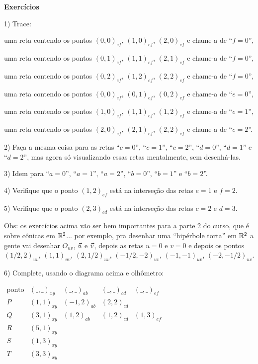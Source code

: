 \documentclass[oneside]{book}
\begin{document}
{\setlength{\parindent}{0em}

{\bf Exercícios}

1) Trace:

uma reta contendo os pontos $(0,0)_{ef}$, $(1,0)_{ef}$, $(2,0)_{ef}$ e
chame-a de ``$f=0$'',

uma reta contendo os pontos $(0,1)_{ef}$, $(1,1)_{ef}$, $(2,1)_{ef}$ e
chame-a de ``$f=0$'',

uma reta contendo os pontos $(0,2)_{ef}$, $(1,2)_{ef}$, $(2,2)_{ef}$ e
chame-a de ``$f=0$'',

uma reta contendo os pontos $(0,0)_{ef}$, $(0,1)_{ef}$, $(0,2)_{ef}$ e
chame-a de ``$e=0$'',

uma reta contendo os pontos $(1,0)_{ef}$, $(1,1)_{ef}$, $(1,2)_{ef}$ e
chame-a de ``$e=1$'',

uma reta contendo os pontos $(2,0)_{ef}$, $(2,1)_{ef}$, $(2,2)_{ef}$ e
chame-a de ``$e=2$''.

\ssk

2) Faça a mesma coisa para as retas ``$c=0$'', ``$c=1$'', ``$c=2$'',
``$d=0$'', ``$d=1$'' e ``$d=2$'', mas agora só visualizando essas
retas mentalmente, sem desenhá-las.

\ssk

3) Idem para ``$a=0$'', ``$a=1$'', ``$a=2$'', ``$b=0$'', ``$b=1$'' e
``$b=2$''.

\ssk

4) Verifique que o ponto $(1,2)_{ef}$ está na interseção das retas
$e=1$ e $f=2$.

\ssk

5) Verifique que o ponto $(2,3)_{cd}$ está na interseção das retas
$c=2$ e $d=3$.

}

\msk

Obs: os exercícios acima vão ser bem importantes para a parte 2 do
curso, que é sobre cônicas em $\mathbb{R}^2$... por exemplo, pra desenhar uma
``hipérbole torta'' em $\mathbb{R}^2$ a gente vai desenhar $O_{uv}$, ${\vec u}$ e
${\vec v}$, depois as retas $u=0$ e $v=0$ e depois os pontos
$(1/2,2)_{uv}$, $(1,1)_{uv}$, $(2,1/2)_{uv}$, $(-1/2,-2)_{uv}$,
$(-1,-1)_{uv}$, $(-2,-1/2)_{uv}$.

\msk

{\setlength{\parindent}{0em}

6) Complete, usando o diagrama acima e olhômetro:

$\begin{array}{cllll}
 \text{ponto} & (\_,\_)_{xy} & (\_,\_)_{ab} & (\_,\_)_{cd} & (\_,\_)_{ef} \\\hline
 P & (1,1)_{xy} & (-1,2)_{ab} & (2,2)_{cd} &            \\
 Q & (3,1)_{xy} & (1,2)_{ab}  & (1,2)_{cd} & (1,3)_{ef} \\
 R & (5,1)_{xy} \\
 S & (1,3)_{xy} \\
 T & (3,3)_{xy} \\
 \end{array}
$

}
\end{document}
